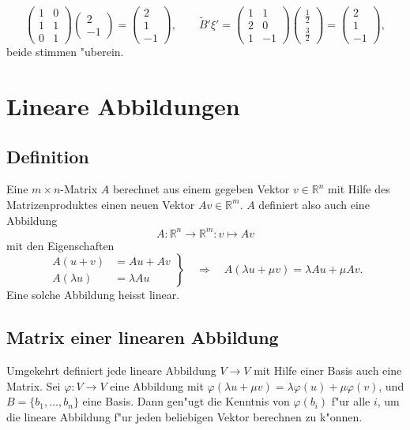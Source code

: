 \begin{beispiel}
\[\begin{pmatrix}
1&0\\
1&1\\
0&1
\end{pmatrix}
\begin{pmatrix}2\\-1\end{pmatrix}
=\begin{pmatrix} 2\\1\\-1 \end{pmatrix}
,\qquad
\tilde B' \xi'
=
\begin{pmatrix}
1& 1\\
2& 0\\
1&-1
\end{pmatrix}\begin{pmatrix}\frac12\\\frac32\end{pmatrix}
=\begin{pmatrix}2\\1\\-1 \end{pmatrix},
\]
beide stimmen "uberein.
\end{beispiel}

\section{Lineare Abbildungen}
\subsection{Definition}
Eine $m\times n$-Matrix $A$ berechnet aus einem gegeben Vektor
$v\in\mathbb R^n$ mit Hilfe des
Matrizenproduktes einen neuen Vektor $Av\in\mathbb R^m$.
$A$ definiert also auch eine Abbildung
\[
A\colon\mathbb R^n\to\mathbb R^m:v\mapsto Av
\]
mit den Eigenschaften
\[
\left.
\begin{aligned}
A(u+v)&=Au+Av\\
A(\lambda u)&=\lambda Au
\end{aligned}\right\}\quad
\Rightarrow\quad
A(\lambda u+\mu v)=\lambda Au+\mu Av.
\]
Eine solche Abbildung heisst linear.

\subsection{Matrix einer linearen Abbildung}
Umgekehrt definiert jede lineare Abbildung $V\to V$ mit Hilfe einer
Basis auch eine Matrix.
Sei $\varphi\colon V\to V$ eine Abbildung
mit $\varphi(\lambda u+\mu v)=\lambda \varphi(u)+\mu\varphi(v)$,
und $B=\{b_1,\dots,b_n\}$ eine Basis.
Dann gen"ugt die Kenntnis
von $\varphi(b_i)$ f"ur alle $i$, um die lineare Abbildung f"ur
jeden beliebigen Vektor berechnen zu k"onnen.

